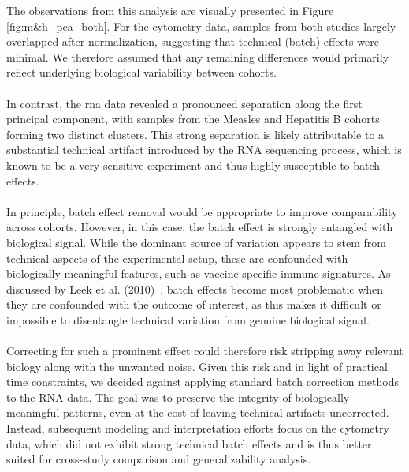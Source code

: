 \documentclass[12pt,a4paper]{report}
\begin{document}
\noindent
The observations from this analysis are visually presented in Figure \ref{fig:m&h_pca_both}. For the cytometry data, samples from both studies largely overlapped after normalization, suggesting that technical (batch) effects were minimal. We therefore assumed that any remaining differences would primarily reflect underlying biological variability between cohorts.\\
\\
In contrast, the \acrshort{rna} data revealed a pronounced separation along the first principal component, with samples from the Measles and Hepatitis B cohorts forming two distinct clusters. This strong separation is likely attributable to a substantial technical artifact introduced by the RNA sequencing process, which is known to be a very sensitive experiment and thus highly susceptible to batch effects.\\
\\
In principle, batch effect removal would be appropriate to improve comparability across cohorts. However, in this case, the batch effect is strongly entangled with biological signal. While the dominant source of variation appears to stem from technical aspects of the experimental setup, these are confounded with biologically meaningful features, such as vaccine-specific immune signatures. As discussed by Leek et al. (2010)~\cite{Leek2010Tackling}, batch effects become most problematic when they are confounded with the outcome of interest, as this makes it difficult or impossible to disentangle technical variation from genuine biological signal.\\
\\
Correcting for such a prominent effect could therefore risk stripping away relevant biology along with the unwanted noise. Given this risk and in light of practical time constraints, we decided against applying standard batch correction methods to the RNA data. The goal was to preserve the integrity of biologically meaningful patterns, even at the cost of leaving technical artifacts uncorrected. Instead, subsequent modeling and interpretation efforts focus on the cytometry data, which did not exhibit strong technical batch effects and is thus better suited for cross-study comparison and generalizability analysis.
\end{document}
